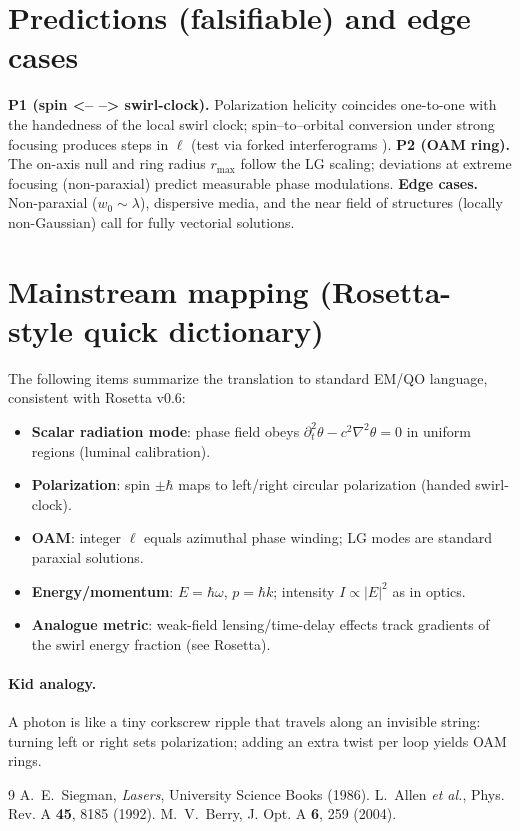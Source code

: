 \documentclass[aps,prb,preprint,amsmath,amssymb]{revtex4-2} %
\begin{document}
    \section{Predictions (falsifiable) and edge cases}
    \textbf{P1 (spin <-- --> swirl-clock).} Polarization helicity coincides one-to-one with the handedness of the local swirl clock;
    spin--to--orbital conversion under strong focusing produces steps in $\ell$ (test via forked interferograms \cite{Berry2001}).
    \textbf{P2 (OAM ring).} The on-axis null and ring radius \(r_{\max}\) follow the LG scaling;
    deviations at extreme focusing (non-paraxial) predict measurable phase modulations.
    \textbf{Edge cases.} Non-paraxial (\(w_0\!\sim\!\lambda\)), dispersive media, and the near field of structures
    (locally non-Gaussian) call for fully vectorial solutions.

    \section{Mainstream mapping (Rosetta-style quick dictionary)}
        The following items summarize the translation to standard EM/QO language, consistent with Rosetta v0.6:
        \begin{itemize}
            \item \textbf{Scalar radiation mode}: phase field obeys $\partial_t^2\theta-c^2\nabla^2\theta=0$ in uniform regions (luminal calibration).
            \item \textbf{Polarization}: spin $\pm\hbar$ maps to left/right circular polarization (handed swirl-clock).
            \item \textbf{OAM}: integer $\ell$ equals azimuthal phase winding; LG modes are standard paraxial solutions.
            \item \textbf{Energy/momentum}: $E=\hbar\omega$, $p=\hbar k$; intensity $I\propto |E|^2$ as in optics.
            \item \textbf{Analogue metric}: weak-field lensing/time-delay effects track gradients of the swirl energy fraction (see Rosetta).
        \end{itemize}

    \paragraph{Kid analogy.}
        A photon is like a tiny corkscrew ripple that travels along an invisible string:
        turning left or right sets polarization; adding an extra twist per loop yields OAM rings.


        
        \begin{thebibliography}{9}
             A.~E.~Siegman, \emph{Lasers}, University Science Books (1986).
             L.~Allen \emph{et al.}, Phys. Rev. A \textbf{45}, 8185 (1992).
             M.~V.~Berry, J. Opt. A \textbf{6}, 259 (2004).
        \end{thebibliography}
\end{document}
